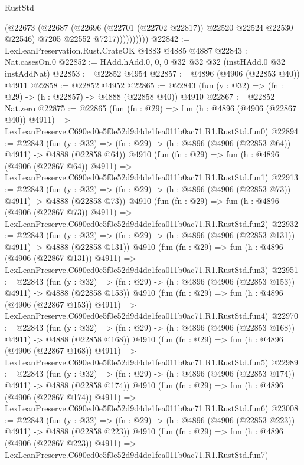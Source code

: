 \begin{lexlean}{RustStd}
\begin{coremodule}
                    (@22673
                      (@22687
                        (@22696 (@22701 (@22702 @22817)) @22520 @22524 @22530 @22546)
                        @7205
                        @22552
                        @7217))))))))))
@22842 := LexLeanPreservation.Rust.CrateOK @4883 @4885 @4887
@22843 := Nat.casesOn.{0}
@22852 := HAdd.hAdd.{0, 0, 0} @32 @32 @32 (instHAdd.{0} @32 instAddNat)
@22853 := @22852 @4954
@22857 := @4896 (@4906 (@22853 @40)) @4911
@22858 := @22852 @4952
@22865 := @22843 (fun (y : @32) => (fn : @29) -> (h : @22857) -> @4888 (@22858 @40)) @4910
@22867 := @22852 Nat.zero
@22875 := @22865
    (fun (fn : @29) =>
    fun (h : @4896 (@4906 (@22867 @40)) @4911) =>
    LexLeanPreserve.C690ed0e5f0e52d9d4de1fea011b0ac71.R1.RustStd.fun0)
@22894 := @22843
    (fun (y : @32) => (fn : @29) -> (h : @4896 (@4906 (@22853 @64)) @4911) -> @4888 (@22858 @64))
    @4910
    (fun (fn : @29) =>
    fun (h : @4896 (@4906 (@22867 @64)) @4911) =>
    LexLeanPreserve.C690ed0e5f0e52d9d4de1fea011b0ac71.R1.RustStd.fun1)
@22913 := @22843
    (fun (y : @32) => (fn : @29) -> (h : @4896 (@4906 (@22853 @73)) @4911) -> @4888 (@22858 @73))
    @4910
    (fun (fn : @29) =>
    fun (h : @4896 (@4906 (@22867 @73)) @4911) =>
    LexLeanPreserve.C690ed0e5f0e52d9d4de1fea011b0ac71.R1.RustStd.fun2)
@22932 := @22843
    (fun (y : @32) => (fn : @29) -> (h : @4896 (@4906 (@22853 @131)) @4911) -> @4888 (@22858 @131))
    @4910
    (fun (fn : @29) =>
    fun (h : @4896 (@4906 (@22867 @131)) @4911) =>
    LexLeanPreserve.C690ed0e5f0e52d9d4de1fea011b0ac71.R1.RustStd.fun3)
@22951 := @22843
    (fun (y : @32) => (fn : @29) -> (h : @4896 (@4906 (@22853 @153)) @4911) -> @4888 (@22858 @153))
    @4910
    (fun (fn : @29) =>
    fun (h : @4896 (@4906 (@22867 @153)) @4911) =>
    LexLeanPreserve.C690ed0e5f0e52d9d4de1fea011b0ac71.R1.RustStd.fun4)
@22970 := @22843
    (fun (y : @32) => (fn : @29) -> (h : @4896 (@4906 (@22853 @168)) @4911) -> @4888 (@22858 @168))
    @4910
    (fun (fn : @29) =>
    fun (h : @4896 (@4906 (@22867 @168)) @4911) =>
    LexLeanPreserve.C690ed0e5f0e52d9d4de1fea011b0ac71.R1.RustStd.fun5)
@22989 := @22843
    (fun (y : @32) => (fn : @29) -> (h : @4896 (@4906 (@22853 @174)) @4911) -> @4888 (@22858 @174))
    @4910
    (fun (fn : @29) =>
    fun (h : @4896 (@4906 (@22867 @174)) @4911) =>
    LexLeanPreserve.C690ed0e5f0e52d9d4de1fea011b0ac71.R1.RustStd.fun6)
@23008 := @22843
    (fun (y : @32) => (fn : @29) -> (h : @4896 (@4906 (@22853 @223)) @4911) -> @4888 (@22858 @223))
    @4910
    (fun (fn : @29) =>
    fun (h : @4896 (@4906 (@22867 @223)) @4911) =>
    LexLeanPreserve.C690ed0e5f0e52d9d4de1fea011b0ac71.R1.RustStd.fun7)

\end{coremodule}
\end{lexlean}
